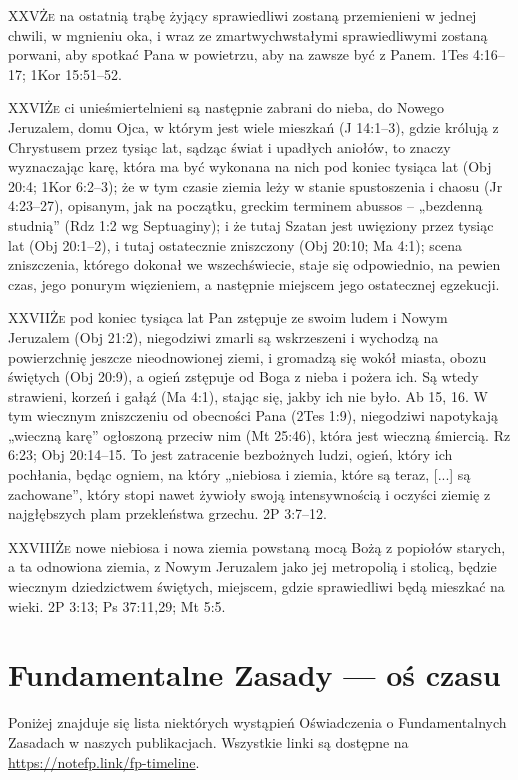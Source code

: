 \lettrine{XXV}{Że} na ostatnią trąbę żyjący sprawiedliwi zostaną przemienieni w jednej chwili, w mgnieniu oka, i wraz ze zmartwychwstałymi sprawiedliwymi zostaną porwani, aby spotkać Pana w powietrzu, aby na zawsze być z Panem. 1Tes 4:16--17; 1Kor 15:51--52.

\lettrine{XXVI}{Że} ci unieśmiertelnieni są następnie zabrani do nieba, do Nowego Jeruzalem, domu Ojca, w którym jest wiele mieszkań (J 14:1--3), gdzie królują z Chrystusem przez tysiąc lat, sądząc świat i upadłych aniołów, to znaczy wyznaczając karę, która ma być wykonana na nich pod koniec tysiąca lat (Obj 20:4; 1Kor 6:2--3); że w tym czasie ziemia leży w stanie spustoszenia i chaosu (Jr 4:23--27), opisanym, jak na początku, greckim terminem abussos – „bezdenną studnią” (Rdz 1:2 wg Septuaginy); i że tutaj Szatan jest uwięziony przez tysiąc lat (Obj 20:1--2), i tutaj ostatecznie zniszczony (Obj 20:10; Ma 4:1); scena zniszczenia, którego dokonał we wszechświecie, staje się odpowiednio, na pewien czas, jego ponurym więzieniem, a następnie miejscem jego ostatecznej egzekucji.

\lettrine{XXVII}{Że} pod koniec tysiąca lat Pan zstępuje ze swoim ludem i Nowym Jeruzalem (Obj  21:2), niegodziwi zmarli są wskrzeszeni i wychodzą na powierzchnię jeszcze nieodnowionej ziemi, i gromadzą się wokół miasta, obozu świętych (Obj 20:9), a ogień zstępuje od Boga z nieba i pożera ich. Są wtedy strawieni, korzeń i gałąź (Ma 4:1), stając się, jakby ich nie było. Ab 15, 16. W tym wiecznym zniszczeniu od obecności Pana (2Tes 1:9), niegodziwi napotykają „wieczną karę” ogłoszoną przeciw nim (Mt 25:46), która jest wieczną śmiercią. Rz 6:23; Obj 20:14--15. To jest zatracenie bezbożnych ludzi, ogień, który ich pochłania, będąc ogniem, na który „niebiosa i ziemia, które są teraz, [...] są zachowane”, który stopi nawet żywioły swoją intensywnością i oczyści ziemię z najgłębszych plam przekleństwa grzechu. 2P 3:7--12.

\lettrine{XXVIII}{Że} nowe niebiosa i nowa ziemia powstaną mocą Bożą z popiołów starych, a ta odnowiona ziemia, z Nowym Jeruzalem jako jej metropolią i stolicą, będzie wiecznym dziedzictwem świętych, miejscem, gdzie sprawiedliwi będą mieszkać na wieki. 2P 3:13; Ps 37:11,29; Mt 5:5.

\section*{Fundamentalne Zasady — oś czasu} \label{appendix:timeline}

Poniżej znajduje się lista niektórych wystąpień Oświadczenia o Fundamentalnych Zasadach w naszych publikacjach. Wszystkie linki są dostępne na \href{https://notefp.link/fp-timeline}{https://notefp.link/fp-timeline}.


